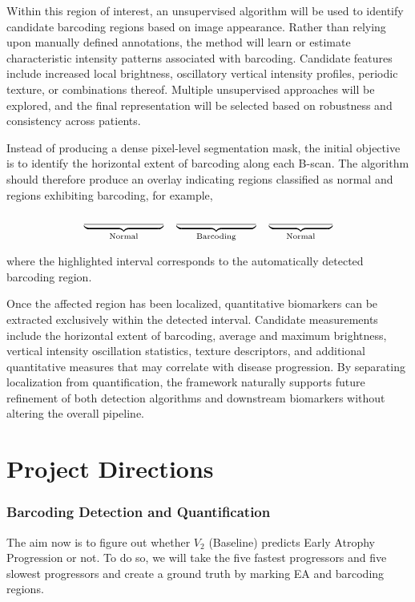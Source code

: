 \documentclass[11pt]{article}
\begin{document}
Within this region of interest, an unsupervised algorithm will be used to identify candidate barcoding regions based on image appearance. Rather than relying upon manually defined annotations, the method will learn or estimate characteristic intensity patterns associated with barcoding. Candidate features include increased local brightness, oscillatory vertical intensity profiles, periodic texture, or combinations thereof. Multiple unsupervised approaches will be explored, and the final representation will be selected based on robustness and consistency across patients.

Instead of producing a dense pixel-level segmentation mask, the initial objective is to identify the horizontal extent of barcoding along each B-scan. The algorithm should therefore produce an overlay indicating regions classified as normal and regions exhibiting barcoding, for example,

\[
\underbrace{\rule{2.5cm}{0.4pt}}_{\text{Normal}}
\quad
\underbrace{\rule{2.5cm}{0.4pt}}_{\text{Barcoding}}
\quad
\underbrace{\rule{2cm}{0.4pt}}_{\text{Normal}}
\]

where the highlighted interval corresponds to the automatically detected barcoding region.

Once the affected region has been localized, quantitative biomarkers can be extracted exclusively within the detected interval. Candidate measurements include the horizontal extent of barcoding, average and maximum brightness, vertical intensity oscillation statistics, texture descriptors, and additional quantitative measures that may correlate with disease progression. By separating localization from quantification, the framework naturally supports future refinement of both detection algorithms and downstream biomarkers without altering the overall pipeline.

\newpage
\part{Project Directions}

\section{Barcoding Detection and Quantification}

The aim now is to figure out whether $V_2$ (Baseline) predicts Early Atrophy Progression or not. To do so, we will take the five fastest progressors and five slowest progressors and create a ground truth by marking EA and barcoding regions.
\end{document}
